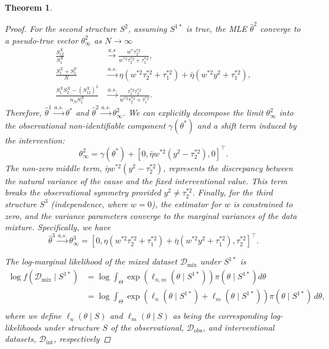 \documentclass[accepted]{uai2026} %
\newcommand{\train}{\mathcal{D}}
\newcommand{\obsdata}{\train_{\text{obs}}}
\newcommand{\mixdata}{\train_{\text{mix}}}
\newcommand{\intdata}{\train_{\text{int}}}
\def\transpose{\intercal}
\theoremstyle{boldremark}
\newtheorem{theorem}{Theorem}[section]
\begin{document}
\begin{theorem}
\begin{proof}
    For the second structure $S^2$, assuming $S^{1*}$ is true, the MLE $\hat{\theta}^2$ converge to a pseudo-true vector $\theta^2_\infty$ as $N \to \infty$
    \begin{align*}
        \frac{S_{12}^X}{S_1^X} &\xrightarrow{a.s} \frac{w^*\tau_2^{*2}}{w^{*2}\tau_2^{*2} + \tau_1^{*2}}, \\
        \frac{S_1^X + S_1^Y}{N} &\xrightarrow{a.s.} \eta(w^{*2}\tau_2^{*2} + \tau_1^{*2}) + \bar{\eta}(w^{*2}y^2 + \tau_1^{*2}), \\
        \frac{S_1^X S_2^X - (S_{12}^X)^2}{n_N S_1^X} &\xrightarrow{a.s.} \frac{\tau_1^{*2}\tau_2^{*2}}{w^{*2}\tau_2^{*2} + \tau_1^{*2}}.
    \end{align*}
    Therefore, $\hat{\theta}^1 \xrightarrow{a.s.} \theta^*$ and $\hat{\theta}^2 \xrightarrow{a.s.} \theta^2_\infty$. We can explicitly decompose the limit $\theta^2_\infty$ into the observational non-identifiable component $\gamma(\theta^*)$ and a shift term induced by the intervention:
    \begin{equation}
        \label{eq:theta2_S1_nonident}
        \theta^2_\infty = \gamma(\theta^*) +  [0, \bar{\eta} w^{*2}(y^2 - \tau_2^{*2}), 0]^\transpose.
    \end{equation}
    The non-zero middle term, $\bar{\eta} w^{*2}(y^2 - \tau_2^{*2})$, represents the discrepancy between the natural variance of the cause and the fixed interventional value. This term breaks the observational symmetry provided $y^2 \neq \tau_2^{*2}$. Finally, for the third structure $S^3$ (independence, where $w=0$), the estimator for $w$ is constrained to zero, and the variance parameters converge to the marginal variances of the data mixture. Specifically, we have
    \begin{equation}
        \hat{\theta}^3 \xrightarrow{a.s.} \theta^3_\infty = [ 0, \eta(w^{*2}\tau_2^{*2} + \tau_1^{*2}) + \bar{\eta}(w^{*2}y^2 + \tau_1^{*2}),\tau_2^{*2}]^\transpose.
    \end{equation}

    The log-marginal likelihood of the mixed dataset $\mixdata$ under $S^{1*}$ is 
    \begin{align*}
    \log f(\mixdata \mid S^{1*}) &= \log \int_{\Theta} \exp(\ell_{n,m}(\theta\mid S^{1*})) \pi(\theta\mid S^{1*})d\theta\\
    &= \log\int_{\Theta} \exp\left(\ell_n(\theta \mid S^{1*}) + \ell_m(\theta \mid S^{1*})\right) \pi(\theta \mid S^{1*}) \, d\theta, \\
    \end{align*}
where we define $\ell_n(\theta\mid S)$ and $\ell_m(\theta\mid S)$ as being the corresponding log-likelihoods under structure $S$ of the observational, $\obsdata$, and interventional datasets, $\intdata$, respectively


\end{proof}
\end{theorem}
\end{document}
